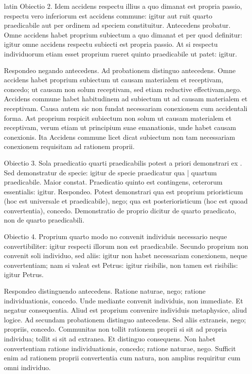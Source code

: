 \begin{otherlanguage*}{latin}
\pstart
  Obiectio 2. Idem accidens respectu illius a quo dimanat est propria passio, respectu vero inferiorum est accidens commune: igitur aut ruit quarto praedicabile aut per ordinem ad speciem constituitur. Antecedens probatur. Omne accidens habet proprium subiectum a quo dimanat et per quod definitur: igitur omne accidens respectu subiecti est propria passio. At si respectu individuorum etiam esset proprium rueret quinto praedicabile ut patet: igitur. 
\pend

\pstart
  Respondeo negando antecedens. Ad probationem distinguo antecedens. Omne accidens habet proprium subiectum ut causam materialem et receptivam, concedo; ut causam non solum receptivam, sed etiam reductive effectivam,nego. Accidens commune habet habitudinem ad subiectum ut ad causam materialem et receptivam. Causa autem sic non fundat necessariam conexionem cum accidentali forma. Ast proprium respicit subiectum non solum ut causam materialem et receptivam, verum etiam ut principium suae emanationis, unde habet causam conexionis. Ita  Accidens commune licet dicat subiectum non tam necessariam conexionem requisitam ad rationem proprii. 
\pend

\pstart
  Obiectio 3. Sola praedicatio quarti praedicabilis potest a priori demonstrari ex . Sed demonstratur de specie: igitur de specie praedicatur qua \textnormal{|} quartum praedicabile. Maior constat. Praedicatio quinto est contingens, ceterorum essentialis: igitur. Respondeo. Potest demonstrari qua est proprium prioristicum (hoc est universale et praedicabile), nego; qua est posterioristicum (hoc est quoad convertentia), concedo. Demonstratio de proprio dicitur de quarto praedicato, non de quarto praedicabili. 
\pend

\pstart
  Obiectio 4. Proprium quarto modo no convenit individuis necessario neque convertibiliter: igitur respecti illorum non est praedicabile. Secundo proprium non convenit soli individuo, sed aliis: igitur non habet necessariam conexionem, neque convertentiam; nam si valeat est Petrus: igitur risibilis, non tamen est risibilis: igitur Petrus. 
\pend

\pstart
  Respondeo distinguendo antecedens. Ratione naturae, nego; ratione individuationis, concedo. Unde mediante convenit individuis, non immediate. Et negatur consequentia. Aliud est proprium convenire individuis metaphysice, aliud logice. Ad secundam probationem distinguo antecedens. Sed aliis extraneis, nego; propriis, concedo. Communitas non tollit rationem proprii si sit ad propria individua; tollit si sit ad extranea. Et distinguo consequens. Non habet convertentiam ratione individuationis, concedo; ratione naturae, nego. Sufficit enim ad rationem proprii convertentia cum natura, non amplius requiritur cum omni individuo. 
\pend


\end{otherlanguage*}
